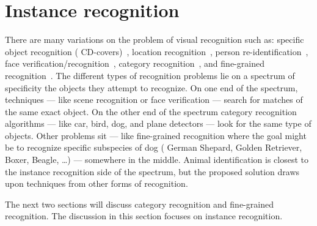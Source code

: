 \section{Instance recognition}\label{sec:ir}
    There are many variations on the problem of visual recognition such as:
    specific object recognition (\eg{}
      CD-covers)~\cite{lowe_distinctive_2004,sivic_efficient_2009,nister_scalable_2006},
    location recognition~\cite{jegou_hamming_2008,jegou_aggregating_2012,tolias_aggregate_2013},
    person re-identification~\cite{shi_embedding_2016,karanam_person_2015,wu_viewpoint_2015},
    face verification/recognition~\cite{chopra_learning_2005,huang_labeled_2007,berg_tomvspete_2012,chen_blessing_2013,taigman_deepface_2014,schroff_facenet_2015},
    category
      recognition~\cite{lazebnik_beyond_2006,zhang_local_2006,mccann_local_2012,boiman_defense_2008},
    and fine-grained recognition~\cite{parkhi_cats_2012,berg_poof_2013, gavves_local_2014}.
    The different types of recognition problems lie on a spectrum of specificity \wrt{} the objects they attempt to
    recognize. On one end of the spectrum,  techniques --- like scene recognition or
    face verification --- search for matches of the same exact object. On the other end of the spectrum category
    recognition algorithms --- like car, bird, dog, and plane detectors --- look for the same type of objects. Other
    problems sit --- like fine-grained recognition where the goal might be to recognize specific subspecies of dog
    (\eg{} German Shepard, Golden Retriever, Boxer, Beagle, \ldots{}) --- somewhere in the middle. Animal identification
    is closest to the instance recognition side of the spectrum, but the proposed solution draws upon techniques from
    other forms of recognition.

    The next two sections will discuss category recognition and fine-grained recognition. The discussion in this section
    focuses on instance recognition.

